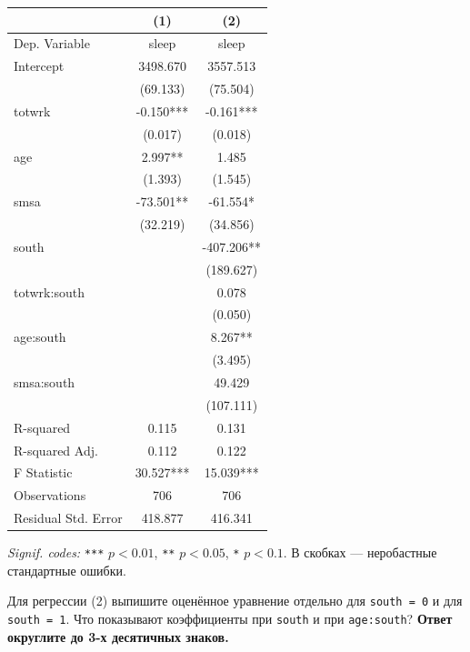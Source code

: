 \documentclass[
  russian,
]{article}
\newcounter{none} %
\begin{document}
{\def\LTcaptype{none} %
\begin{longtable}[]{@{}lcc@{}}
\toprule\noalign{}
& (1) & (2) \\
\midrule\noalign{}
\endhead
\bottomrule\noalign{}
\endlastfoot
Dep. Variable & sleep & sleep \\
Intercept & 3498.670 & 3557.513 \\
& (69.133) & (75.504) \\
totwrk & -0.150*** & -0.161*** \\
& (0.017) & (0.018) \\
age & 2.997** & 1.485 \\
& (1.393) & (1.545) \\
smsa & -73.501** & -61.554* \\
& (32.219) & (34.856) \\
south & & -407.206** \\
& & (189.627) \\
totwrk:south & & 0.078 \\
& & (0.050) \\
age:south & & 8.267** \\
& & (3.495) \\
smsa:south & & 49.429 \\
& & (107.111) \\
R-squared & 0.115 & 0.131 \\
R-squared Adj. & 0.112 & 0.122 \\
F Statistic & 30.527*** & 15.039*** \\
Observations & 706 & 706 \\
Residual Std. Error & 418.877 & 416.341 \\
\end{longtable}
}

\emph{Signif. codes:} \texttt{***} \(p<0.01\), \texttt{**} \(p<0.05\),
\texttt{*} \(p<0.1\). В скобках --- неробастные стандартные ошибки.

Для регрессии (2) выпишите оценённое уравнение отдельно для
\texttt{south\ =\ 0} и для \texttt{south\ =\ 1}. Что показывают
коэффициенты при \texttt{south} и при \texttt{age:south}? \textbf{Ответ
округлите до 3-х десятичных знаков.}
\end{document}
